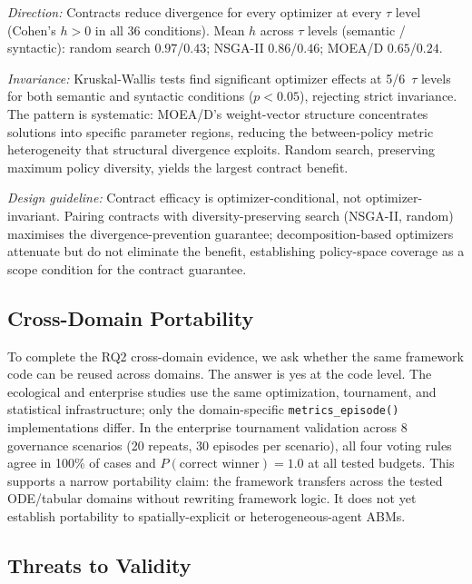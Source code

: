 \documentclass{wscpaperproc}
\begin{document}
\emph{Direction:} Contracts reduce divergence for every optimizer at every
$\tau$ level (Cohen's $h\!>\!0$ in all 36 conditions). Mean $h$ across
$\tau$ levels (semantic / syntactic): random search $0.97$/$0.43$; NSGA-II
$0.86$/$0.46$; MOEA/D $0.65$/$0.24$.

\emph{Invariance:} Kruskal-Wallis tests find significant optimizer effects at
5/6~$\tau$ levels for both semantic and syntactic conditions ($p\!<\!0.05$),
rejecting strict invariance. The pattern is systematic: MOEA/D's weight-vector
structure concentrates solutions into specific parameter regions, reducing the
between-policy metric heterogeneity that structural divergence exploits. Random
search, preserving maximum policy diversity, yields the largest contract benefit.

\emph{Design guideline:} Contract efficacy is optimizer-conditional, not
optimizer-invariant. Pairing contracts with diversity-preserving search (NSGA-II,
random) maximises the divergence-prevention guarantee; decomposition-based optimizers
attenuate but do not eliminate the benefit, establishing policy-space coverage as
a scope condition for the contract guarantee.

\subsection{Cross-Domain Portability}
\label{sec:crossdomain}

To complete the RQ2 cross-domain evidence, we ask whether the same framework
code can be reused across domains. The answer is yes at the code level. The ecological and
enterprise studies use the same optimization, tournament, and statistical
infrastructure; only the domain-specific \texttt{metrics\_episode()}
implementations differ. In the enterprise tournament validation across 8
governance scenarios (20 repeats, 30 episodes per scenario), all four voting
rules agree in 100\% of cases and $P(\text{correct winner})\!=\!1.0$ at all
tested budgets. This supports a narrow portability claim: the framework
transfers across the tested ODE/tabular domains without rewriting framework
logic. It does not yet establish portability to spatially-explicit or
heterogeneous-agent ABMs.

\subsection{Threats to Validity}
\end{document}

